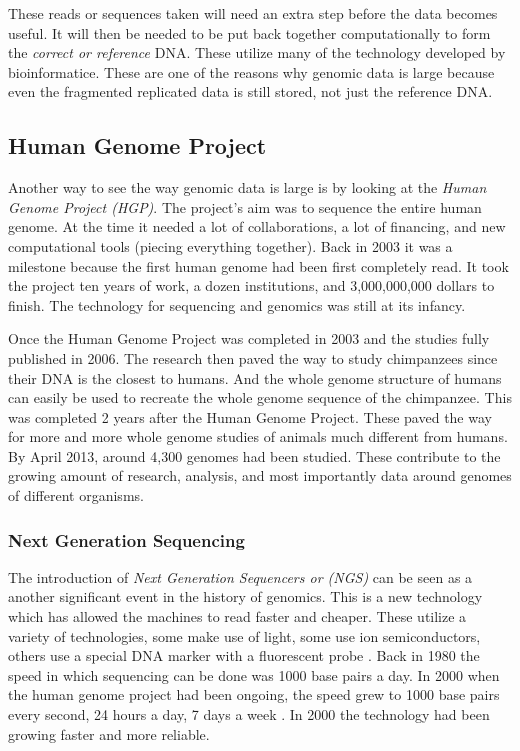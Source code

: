 \documentclass[acmsmall]{acmart}
\begin{document}
These reads or sequences taken will need an extra step before the data becomes useful. It will then be needed to be put back together computationally to form the \textit{correct or reference} DNA. These utilize many of the technology developed by bioinformatice. These are one of the reasons why genomic data is large because even the fragmented replicated data is still stored, not just the reference DNA.

\subsection{Human Genome Project}

Another way to see the way genomic data is large is by looking at the \textit{Human Genome Project (HGP)}. The project's aim was to sequence the entire human genome. At the time it needed a lot of collaborations, a lot of financing, and new computational tools (piecing everything together). Back in 2003 it was a milestone because the first human genome \cite{introgenomics} had been first completely read. It took the project ten years of work, a dozen institutions, and 3,000,000,000 dollars to finish. The technology for sequencing and genomics was still at its infancy. 

Once the Human Genome Project was completed in 2003 and the studies fully published in 2006. The research then paved the way to study chimpanzees since their DNA is the closest to humans. And the whole genome structure of humans can easily be used to recreate the whole genome sequence of the chimpanzee. This was completed 2 years after the Human Genome Project\cite{campbell}. These paved the way for more and more whole genome studies of animals much different from humans. By April 2013, around 4,300 genomes had been studied\cite[~p.442]{campbell}. These contribute to the growing amount of research, analysis, and most importantly data around genomes of different organisms.


\subsubsection{Next Generation Sequencing}

The introduction of \textit{Next Generation Sequencers or (NGS)} can be seen as a another significant event in the history of genomics. This is a new technology which has allowed the machines to read faster and cheaper. These utilize a variety of technologies, some make use of light, some use ion semiconductors, others use a special DNA marker with a fluorescent probe \cite[~p.67]{paulselzer2018}.  Back in 1980 the speed in which sequencing can be done was 1000 base pairs a day. In 2000 when the human genome project had been ongoing, the speed grew to 1000 base pairs every second, 24 hours a day, 7 days a week \cite{campbell}.  In 2000 the technology had been growing faster and more reliable.
\end{document}
